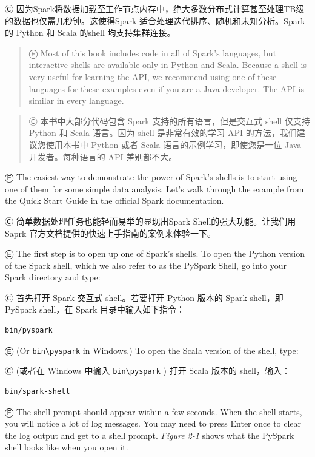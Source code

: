 Ⓒ 因为Spark将数据加载至工作节点内存中，绝大多数分布式计算甚至处理TB级的数据也仅需几秒钟。这使得Spark 适合处理迭代排序、随机和未知分析。Spark 的 Python 和 Scala 的shell 均支持集群连接。

\begin{quote}
Ⓔ \textcolor{etc}{Most of this book includes code in all of Spark's languages, but interactive shells are available only in Python and Scala. Because a shell is very useful for learning the API, we recommend using one of these languages for these examples even if you are a Java developer. The API is similar in every language.}
\end{quote}

\begin{quote}
Ⓒ 本书中大部分代码包含 Spark 支持的所有语言，但是交互式 shell 仅支持
Python 和 Scala 语言。因为 shell 是非常有效的学习 API
的方法，我们建议您使用本书中 Python 或者 Scala
语言的示例学习，即使您是一位 Java 开发者。每种语言的 API 差别都不大。
\end{quote}

Ⓔ \textcolor{etc}{The easiest way to demonstrate the power of Spark's shells is to start using one of them for some simple data analysis. Let's walk through the example from the Quick Start Guide in the official Spark documentation.}

Ⓒ 简单数据处理任务也能轻而易举的显现出Spark Shell的强大功能。让我们用
Saprk 官方文档提供的快速上手指南的案例来体验一下。

Ⓔ \textcolor{etc}{The first step is to open up one of Spark's shells. To open the Python version of the Spark shell, which we also refer to as the PySpark Shell, go into your Spark directory and type:}

Ⓒ 首先打开 Spark 交互式 shell。若要打开 Python 版本的 Spark
shell，即PySpark shell，在 Spark 目录中输入如下指令：

\begin{lstlisting}
bin/pyspark
\end{lstlisting}

Ⓔ \textcolor{etc}{(Or \lstinline{bin\pyspark} in Windows.) To open the Scala version of the shell, type:}

Ⓒ (或者在 Windows 中输入 \lstinline{bin\pyspark} ) 打开
Scala 版本的 shell，输入：

\begin{lstlisting}
bin/spark-shell
\end{lstlisting}

Ⓔ \textcolor{etc}{The shell prompt should appear within a few seconds. When the shell starts, you will notice a lot of log messages. You may need to press Enter once to clear the log output and get to a shell prompt. \emph{Figure 2-1} shows what the PySpark shell looks like when you open it.}

